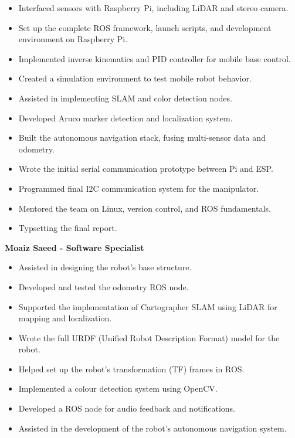 \documentclass{article}
\begin{document}
\begin{itemize}
\footnotesize
  
\item Interfaced sensors with Raspberry Pi, including LiDAR and stereo camera.
    
\item Set up the complete ROS framework, launch scripts, and development environment on Raspberry Pi.
    
\item Implemented inverse kinematics and PID controller for mobile base control.
    
\item Created a simulation environment to test mobile robot behavior.
    
\item Assisted in implementing SLAM and color detection nodes.
    
\item Developed Aruco marker detection and localization system.
    
\item Built the autonomous navigation stack, fusing multi-sensor data and odometry.
    
\item Wrote the initial serial communication prototype between Pi and ESP.
    
\item Programmed final I2C communication system for the manipulator.
    
\item Mentored the team on Linux, version control, and ROS fundamentals.

\item Typsetting the final report.
\end{itemize}

\textbf{Moaiz Saeed - Software Specialist}

\begin{itemize}
\footnotesize

\item Assisted in designing the robot's base structure.
  
\item Developed and tested the odometry ROS node.
    
\item Supported the implementation of Cartographer SLAM using LiDAR for mapping and localization.
    
\item Wrote the full URDF (Unified Robot Description Format) model for the robot.
    
\item Helped set up the robot's transformation (TF) frames in ROS.
    
\item Implemented a colour detection system using OpenCV.
    
\item Developed a ROS node for audio feedback and notifications.
    
\item Assisted in the development of the robot's autonomous navigation system.
\end{itemize}
\end{document}
